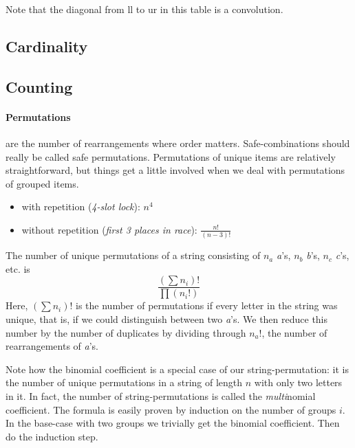 Note that the diagonal from ll to ur in this table is a convolution. 

\subsection{Cardinality}


\subsection{Counting}

\paragraph{Permutations} are the number of rearrangements where order matters. Safe-combinations should really be called safe permutations. Permutations of unique items are relatively straightforward, but things get a little involved when we deal with permutations of grouped items. 

\begin{itemize}
    \item with repetition (\emph{4-slot lock}): $n^4$
    \item without repetition (\emph{first 3 places in race}): $\frac{n!}{(n-3)!}$
\end{itemize}

The number of unique permutations of a string consisting of $n_a$ \emph{a}'s, $n_b$ \emph{b}'s, $n_c$ \emph{c}'s, etc. is 
$$ \frac{( \sum n_i )!}{\prod (n_i !)} $$
Here, $( \sum n_i )! $ is the number of permutations if every letter in the string was unique, that is, if we could distinguish between two \emph{a}'s. We then reduce this number by the number of duplicates by dividing through $n_a !$, the number of rearrangements of \emph{a}'s.

Note how the binomial coefficient is a special case of our string-permutation: it is the number of unique permutations in a string of length $n$ with only two letters in it. 
In fact, the number of string-permutations is called the \emph{multi}nomial coefficient. The formula is easily proven by induction on the number of groups $i$. In the base-case with two groups we trivially get the binomial coefficient. Then do the induction step. 


